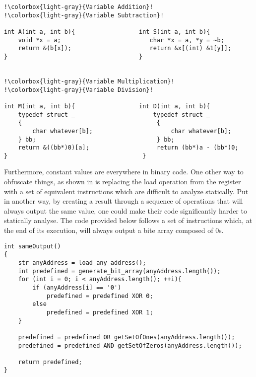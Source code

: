 
\begin{lstlisting}[caption = {Obfuscated computations}, columns=fixed, basewidth=0.5em, basicstyle={\ttfamily}, frame=lines, escapechar=!]
!\colorbox{light-gray}{Variable Addition}!                    !\colorbox{light-gray}{Variable Subtraction}!
     
int A(int a, int b){                  int S(int a, int b){
    void *x = a;                         char *x = a, *y = ~b;
    return &(b[x]);                      return &x[(int) &1[y]];
}                                     }


!\colorbox{light-gray}{Variable Multiplication}!              !\colorbox{light-gray}{Variable Division}!
  
int M(int a, int b){                  int D(int a, int b){
    typedef struct _                      typedef struct _
    {                                      {
        char whatever[b];                      char whatever[b];
    } bb;                                  } bb;
    return &((bb*)0)[a];                   return (bb*)a - (bb*)0;
}                                      }
\end{lstlisting}
\vspace{10pt}
Furthermore, constant values are everywhere in binary code. One other way to obfuscate things, as shown in \cite{moser2007limits} is replacing the load operation from the register with a set of equivalent instructions which are difficult to analyze statically. Put in another way, by creating a result through a sequence of operations that will always output the same value, one could make their code significantly harder to statically analyse. The code provided below follows a set of instructions which, at the end of its execution, will always output a bite array composed of 0s. \newpage
\begin{lstlisting}[caption = {Obfuscated predicted output}, columns=fixed, basewidth=0.5em, basicstyle={\ttfamily}, frame=lines]
int sameOutput()
{
    str anyAddress = load_any_address();
    int predefined = generate_bit_array(anyAddress.length());
    for (int i = 0; i < anyAddress.length(); ++i){
        if (anyAddress[i] == '0')
            predefined = predefined XOR 0;
        else
            predefined = predefined XOR 1;
    }

    predefined = predefined OR getSetOfOnes(anyAddress.length());
    predefined = predefined AND getSetOfZeros(anyAddress.length());

    return predefined;
}
\end{lstlisting}


